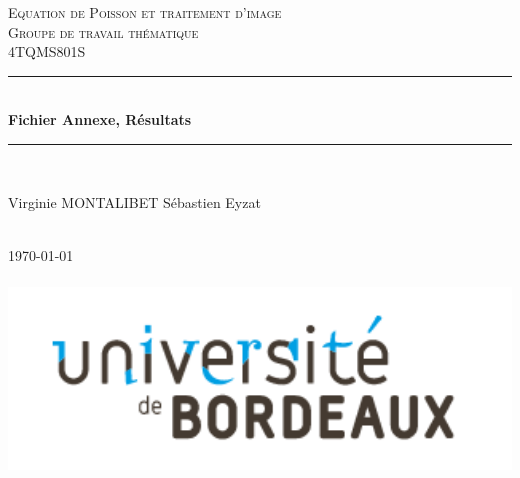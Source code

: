 \documentclass{article}
\begin{document}
\begin{titlepage}
\newcommand{\HRule}{\rule{\linewidth}{0.1mm}} 
\center


\textsc{\Large Equation de Poisson et traitement d'image}\\[0.5cm]
\textsc{\Large Groupe de travail thématique}\\[0.5cm] 
\textsc{4TQMS801S}\\[0.5cm] 


\HRule \\[0.4cm]
{ \huge \bfseries Fichier Annexe, Résultats}\\[0.1cm] %
\HRule \\[1.5cm]


\begin{minipage}{1.0\textwidth}
\Large  Virginie MONTALIBET \hfill Sébastien Eyzat 

\end{minipage}
\begin{minipage}{1.0\textwidth}
\end{minipage}\\[1cm]

{\Large \today}\\[1cm]
\includegraphics[width=15cm,  height=6cm,  keepaspectratio]
{Images/logo.png}
\vfill
\end{titlepage}
\end{document}
